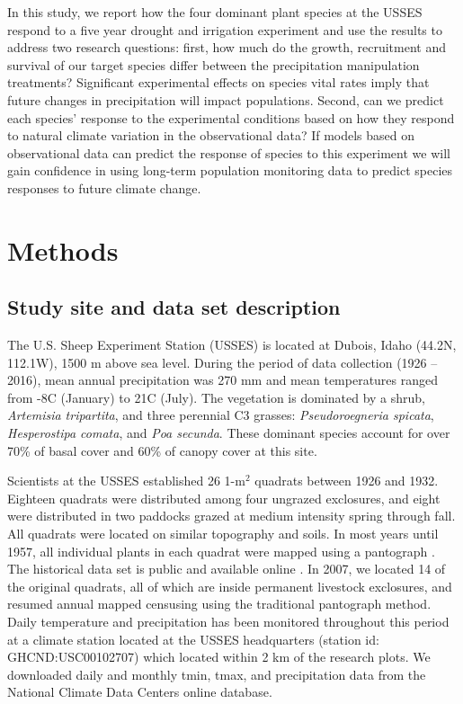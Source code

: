 \documentclass[11pt]{article}
\begin{document}
\begin{doublespace}
In this study, we report how the four dominant plant species at the USSES respond to a five year drought and irrigation experiment and use the results to address two research questions: first, how much do the growth, recruitment and survival of our target species differ between the precipitation manipulation treatments? Significant experimental effects on species vital rates imply that future changes in precipitation will impact populations. Second, can we predict each species' response to the experimental conditions based on how they respond to natural climate variation in the observational data? If models based on observational data can predict the response of species to this experiment we will gain confidence in using long-term population monitoring data to predict species responses to future climate change. 

\section*{Methods}

\subsection*{Study site and data set description}

The U.S. Sheep Experiment Station (USSES) is located at Dubois, Idaho (44.2\degree N, 112.1\degree W), 1500 m above sea level. During the period of data collection (1926 – 2016), mean annual precipitation was 270 mm and mean temperatures ranged from -8\degree C (January) to 21\degree C (July). The vegetation is dominated by a shrub, \textit{Artemisia tripartita}, and three perennial C3 grasses: \textit{Pseudoroegneria spicata}, \textit{Hesperostipa comata}, and \textit{Poa secunda}. These dominant species account for over 70\% of basal cover and 60\% of canopy cover at this site. 

Scientists at the USSES established 26 1-m$^2$ quadrats between 1926 and 1932. Eighteen quadrats were distributed among four ungrazed exclosures, and eight were distributed in two paddocks grazed at medium intensity spring through fall. All quadrats were located on similar topography and soils. In most years until 1957, all individual plants in each quadrat were mapped using a pantograph \citep{blaisdell_seasonal_1958}. The historical data set is public and available online \citep{zachmann_mapped_2010}. In 2007, we located 14 of the original quadrats, all of which are inside permanent livestock exclosures, and resumed annual mapped censusing using the traditional pantograph method. Daily temperature and precipitation has been monitored throughout this period at a climate station located at the USSES headquarters (station id: GHCND:USC00102707) which located within 2 km of the research plots.  We downloaded daily and monthly tmin, tmax, and precipitation data from the National Climate Data Centers online database.  


\end{doublespace}
\end{document}
